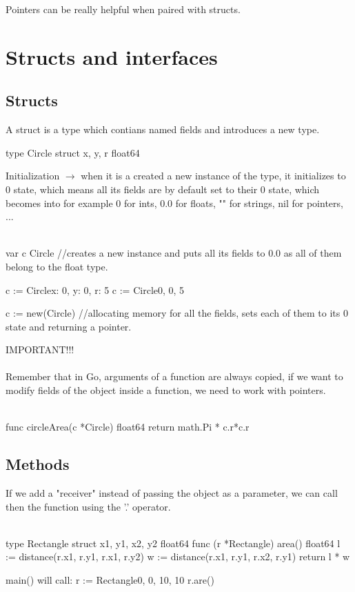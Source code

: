 \documentclass[twoside,a4paper,english]{report}
\begin{document}
Pointers can be really helpful when paired with structs.
\chapter{Structs and interfaces}
\section{Structs}
A struct is a type which contians named fields and introduces a new type.
\begin{go}
type Circle struct {
  x, y, r float64
}
\end{go}
Initialization $\rightarrow$ when it is a created a new instance of the type, it initializes to 0 state, which means all its fields are by default set to their 0 state, which becomes into for example 0 for ints, 0.0 for floats, "" for strings, nil for pointers, ...\\\\
\begin{go}
var c Circle    //creates a new instance and puts all its fields to 0.0 as all of them belong to the float type.

c := Circle{x: 0, y: 0, r: 5}
c := Circle{0, 0, 5}

c := new(Circle)  //allocating memory for all the fields, sets each of them to its 0 state and returning a pointer.
\end{go}
{\color{my_blue}IMPORTANT!!!}\\\\ 
Remember that in Go, arguments of a function are always copied, if we want to modify fields of the object inside a function, we need to work with pointers.\\\\
\begin{go}
func circleArea(c *Circle) float64 {
    return math.Pi * c.r*c.r
}
\end{go}
\section{Methods}
If we add a "receiver" instead of passing the object as a parameter, we can call then the function using the '.' operator.\\\\
\begin{go}
type Rectangle struct {
  x1, y1, x2, y2 float64
}
func (r *Rectangle) area() float64 {
  l := distance(r.x1, r.y1, r.x1, r.y2)
  w := distance(r.x1, r.y1, r.x2, r.y1)
  return l * w
}

main() will call:
    r := Rectangle{0, 0, 10, 10}
    r.are()

\end{go}    
\end{document}
